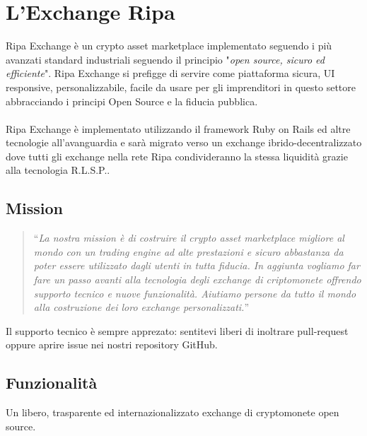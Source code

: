 \documentclass[11pt,fleqn,oneside]{book} %
\begin{document}


\chapter{L'Exchange Ripa}
Ripa Exchange è un crypto asset marketplace implementato seguendo i più avanzati standard industriali seguendo il principio
"\textit{open source, sicuro ed efficiente}". Ripa Exchange si prefigge di servire come piattaforma sicura, UI responsive, 
personalizzabile, facile da usare per gli imprenditori in questo settore abbracciando i principi Open Source e la fiducia pubblica.\\\\
Ripa Exchange è implementato utilizzando il framework Ruby on Rails ed altre tecnologie all'avanguardia e sarà migrato verso
un exchange ibrido-decentralizzato dove tutti gli exchange nella rete Ripa condivideranno la stessa liquidità grazie alla tecnologia R.L.S.P..

\section{Mission}
\begin{quotation}
	``\textit{La nostra mission è di costruire il crypto asset marketplace migliore al mondo con un trading engine ad alte prestazioni 
	e sicuro abbastanza da poter essere utilizzato dagli utenti in tutta fiducia. In aggiunta vogliamo far fare un passo avanti 
	alla tecnologia degli exchange di criptomonete offrendo supporto tecnico e nuove funzionalità. Aiutiamo persone da tutto il mondo
	alla costruzione dei loro exchange personalizzati.}''
\end{quotation}

Il supporto tecnico è sempre apprezato: sentitevi liberi di inoltrare pull-request oppure aprire issue nei nostri repository GitHub.

\section{Funzionalità}
Un libero, trasparente ed internazionalizzato exchange di cryptomonete open source.\\
\end{document}
